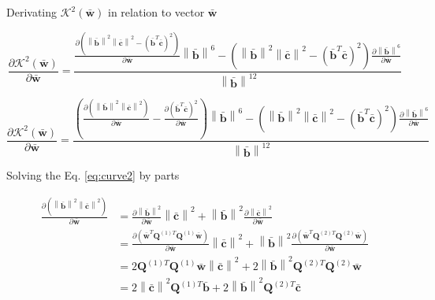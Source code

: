 Derivating $\mathcal{K}^{2}(\mathbf{\bar{w}})$ in relation to vector $\mathbf{\bar{w}}$

\begin{equation}
\frac{
\partial 
\mathcal{K}^{2}(\mathbf{\bar{w}})
}
{
\partial \mathbf{\bar{w}}
}
=
\frac{
\frac{
\partial 
\left(
\left\|
\mathbf{\bar{b}} 
\right\|^{2}
\left\|
\mathbf{\bar{c}}
\right\|^{2}
-
\left(
\mathbf{\bar{b}}^{T}
\mathbf{\bar{c}}
\right)^{2}
\right)
}
{\partial \mathbf{\bar{w}}}
\left\| \mathbf{\bar{b}} \right\|^{6}
-
\left(
\left\|
\mathbf{\bar{b}} 
\right\|^{2}
\left\|
\mathbf{\bar{c}}
\right\|^{2}
-
\left(
\mathbf{\bar{b}}^{T}
\mathbf{\bar{c}}
\right)^{2}
\right)
\frac{
\partial
\left\| \mathbf{\bar{b}} \right\|^{6}
}
{
\partial \mathbf{\bar{w}}
}
}
{\left\| \mathbf{\bar{b}} \right\|^{12}}
\end{equation}



\begin{equation}\label{eq:curve2}
\frac{
\partial 
\mathcal{K}^{2}(\mathbf{\bar{w}})
}
{
\partial \mathbf{\bar{w}}
}
=
\frac{
\left(
\frac{
\partial 
\left(
\left\|\mathbf{\bar{b}}\right\|^2
\left\|\mathbf{\bar{c}}\right\|^2
\right)
}
{\partial \mathbf{\bar{w}}}
-
\frac{
\partial
\left(
\mathbf{\bar{b}}^{T}
\mathbf{\bar{c}}
\right)^{2}
}
{\partial \mathbf{\bar{w}}}
\right)
\left\| \mathbf{\bar{b}} \right\|^{6}
-
\left(
\left\|
\mathbf{\bar{b}} 
\right\|^{2}
\left\|
\mathbf{\bar{c}}
\right\|^{2}
-
\left(
\mathbf{\bar{b}}^{T}
\mathbf{\bar{c}}
\right)^{2}
\right)
\frac{
\partial
\left\| \mathbf{\bar{b}} \right\|^{6}
}
{
\partial \mathbf{\bar{w}}
}
}
{\left\| \mathbf{\bar{b}} \right\|^{12}}
\end{equation}

Solving \cite[pp. 11]{petersen2008matrix} the Eq. \ref{eq:curve2} by parts

\begin{align}
\frac{
\partial 
\left(
\left\|\mathbf{\bar{b}}\right\|^2
\left\|\mathbf{\bar{c}}\right\|^2
\right)
}
{\partial \mathbf{\bar{w}}}
&=
\frac{
\partial 
\left\|\mathbf{\bar{b}}\right\|^2
}
{\partial \mathbf{\bar{w}}}
\left\|\mathbf{\bar{c}}\right\|^2
+
\left\|\mathbf{\bar{b}}\right\|^2
\frac{
\partial 
\left\|\mathbf{\bar{c}}\right\|^2
}
{\partial \mathbf{\bar{w}}}\\
~
&=
\frac{
\partial 
\left(
\mathbf{\bar{w}}^{T} \mathbf{Q}^{(1)T}
\mathbf{Q}^{(1)} \mathbf{\bar{w}}
\right)
}
{\partial \mathbf{\bar{w}}}
\left\|\mathbf{\bar{c}}\right\|^2
+
\left\|\mathbf{\bar{b}}\right\|^2
\frac{
\partial 
\left(
\mathbf{\bar{w}}^{T} \mathbf{Q}^{(2)T}
\mathbf{Q}^{(2)} \mathbf{\bar{w}}
\right)
}
{\partial \mathbf{\bar{w}}}\\
~
&=
2
\mathbf{Q}^{(1)T} \mathbf{Q}^{(1)} \mathbf{\bar{w}}
\left\|\mathbf{\bar{c}}\right\|^2
+
2
\left\|\mathbf{\bar{b}}\right\|^2
\mathbf{Q}^{(2)T} \mathbf{Q}^{(2)} \mathbf{\bar{w}}\\
~
&=
2
\left\|\mathbf{\bar{c}}\right\|^2
\mathbf{Q}^{(1)T} \mathbf{\bar{b}}
+
2
\left\|\mathbf{\bar{b}}\right\|^2
\mathbf{Q}^{(2)T} \mathbf{\bar{c}}
\end{align}

